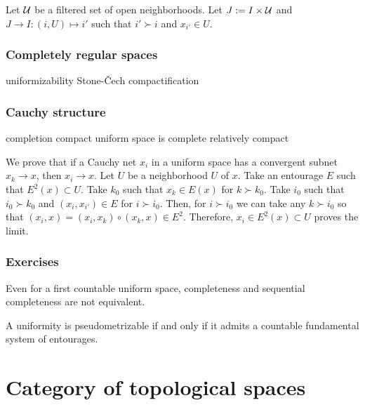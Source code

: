 \documentclass{../../large}
\begin{document}
\begin{prb}
Let $\mathcal{U}$ be a filtered set of open neighborhoods.
Let $J:=I\times\mathcal{U}$ and $J\to I:(i,U)\mapsto i'$ such that $i'\succ i$ and $x_{i'}\in U$.
\end{prb}

\section{Completely regular spaces}
uniformizability
Stone-\v Cech compactification

\section{Cauchy structure}
completion
compact uniform space is complete
relatively compact


We prove that if a Cauchy net $x_i$ in a uniform space has a convergent subnet $x_k\to x$, then $x_i\to x$.
Let $U$ be a neighborhood $U$ of $x$.
Take an entourage $E$ such that $E^2(x)\subset U$.
Take $k_0$ such that $x_k\in E(x)$ for $k\succ k_0$.
Take $i_0$ such that $i_0\succ k_0$ and $(x_i,x_{i'})\in E$ for $i\succ i_0$.
Then, for $i\succ i_0$ we can take any $k\succ i_0$ so that $(x_i,x)=(x_i,x_k)\circ(x_k,x)\in E^2$.
Therefore, $x_i\in E^2(x)\subset U$ proves the limit.


\section*{Exercises}
\begin{prb}
Even for a first countable uniform space, completeness and sequential completeness are not equivalent.
\end{prb}
\begin{prb}
A uniformity is pseudometrizable if and only if it admits a countable fundamental system of entourages.
\end{prb}



\chapter{}





\part{Category of topological spaces}
\end{document}
